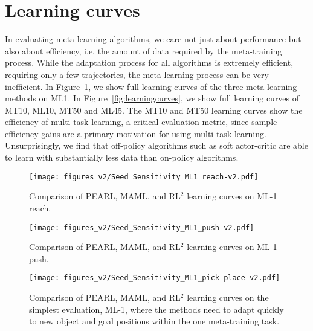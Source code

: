 \section{Learning curves}
\label{app:curves}

In evaluating meta-learning algorithms, we care not just about performance but also about efficiency, i.e. the amount of data required by the meta-training process. While the adaptation process for all algorithms is extremely efficient, requiring only a few trajectories, the meta-learning process can be very inefficient.
In Figure~\ref{fig:babyresults}, we show full learning curves of the three meta-learning methods on ML1. In Figure~\ref{fig:learningcurves}, we show full learning curves of MT10, ML10, MT50 and ML45.
The MT10 and MT50 learning curves show the efficiency of multi-task learning, a critical evaluation metric, since sample efficiency gains are a primary motivation for using multi-task learning. 
Unsurprisingly, we find that off-policy algorithms such as soft actor-critic are able to learn with substantially less data than on-policy algorithms.


\begin{figure}[H]
    \centering
\texttt{[image: figures\_v2/Seed\_Sensitivity\_ML1\_reach-v2.pdf]}
    \caption{Comparison of PEARL, MAML, and RL$^2$ learning curves on ML-1 reach.}
    \label{fig:babyresults}
\end{figure}
\begin{figure}[H]
\centering
    \texttt{[image: figures\_v2/Seed\_Sensitivity\_ML1\_push-v2.pdf]}
    \caption{Comparison of PEARL, MAML, and RL$^2$ learning curves on ML-1 push.}
    \label{fig:ml1-push}
\end{figure}
\clearpage
\begin{figure}[H]
    \centering
    \texttt{[image: figures\_v2/Seed\_Sensitivity\_ML1\_pick-place-v2.pdf]}
    \label{fig:ml1-pick-place}
    \caption{Comparison of PEARL, MAML, and RL$^2$ learning curves on the simplest evaluation, ML-1, where the methods need to adapt quickly to new object and goal positions within the one meta-training task.}
\end{figure}


